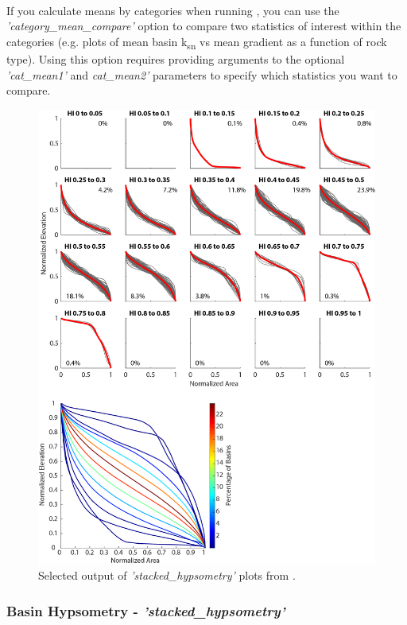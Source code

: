 \paragraph{}If you calculate means by categories when running , you can use the \textit{'category\_mean\_compare'} option to compare two statistics of interest within the categories (e.g. plots of mean basin k\textsubscript{sn} vs mean gradient as a function of rock type). Using this option requires providing arguments to the optional \textit{'cat\_mean1'}  and \textit{cat\_mean2'} parameters to specify which statistics you want to compare.

\begin{figure}[H]
	\centering
	\includegraphics[width=12cm]{PNGs/BasinHypsometry.png}
	\caption{Selected output of \textit{'stacked\_hypsometry'} plots from .}
	\label{fig:Hyps}
\end{figure}

\subsubsection{Basin Hypsometry - \textit{'stacked\_hypsometry'}} \label{sec:hyps}
